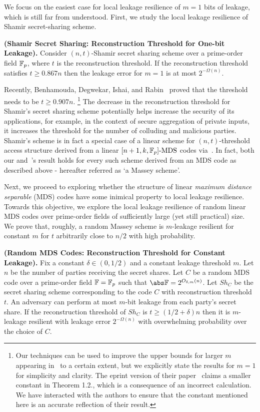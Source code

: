 We focus on the easiest case for local leakage resilience of $m=1$ bits of leakage, which is still far from understood. First, we study the local leakage resilience of Shamir secret-sharing scheme.


\begin{theorem}
\textbf{(Shamir Secret Sharing: Reconstruction Threshold for One-bit Leakage).} Consider $(n,t)$-Shamir secret sharing scheme over a prime-order field ${\mathbb F}_p$, where $t$ is the
reconstruction threshold. 
If the reconstruction threshold satisfies $t\geq 0.867n$ then the leakage error for $m=1$ is at most $2^{-\Omega(n)}$. 
\end{theorem}

Recently, Benhamouda, Degwekar, Ishai, and Rabin~\cite{C:BDIR18} proved that the threshold needs to be $t\geq 0.907n$.
\footnote{Our techniques can be used to improve the upper bounds for larger $m$ appearing in~\cite{C:BDIR18} to a certain extent, but we explicitly state the results for $m=1$ for simplicity and clarity.
  The eprint version of their paper~\cite{EPRINT:BDIR19} claims a smaller constant in Theorem 1.2., which is a consequence of an incorrect calculation.
  We have interacted with the authors to ensure that the constant mentioned here is an accurate reflection of their result. 
}
The decrease in the reconstruction threshold for Shamir's secret sharing scheme potentially helps increase the security of its applications, for example, in the context of secure aggregation of private inputs, it increases the threshold for the number of colluding and malicious parties. 
Shamir's scheme is in fact a special case of a linear scheme for $(n,t)$-threshold access structure
derived from a linear $[n+1,k,\mathbb{F}_p]\text{-MDS}$ codes via~\cite{Mas95}. 
In fact, both our and~\cite{C:BDIR18}'s result holds for every such scheme derived from an MDS code as described above - hereafter referred as `a Massey scheme'.

Next, we proceed to exploring whether the structure of linear {\em maximum distance separable} (MDS) codes have some inimical property to local leakage resilience. 
Towards this objective, we explore the local leakage resilience of random linear MDS codes over prime-order fields of sufficiently large (yet still practical) size. We prove that, roughly, a random Massey scheme is $m$-leakage resilient for constant $m$ for $t$ arbitrarily close to $n/2$ with high probability.


\begin{theorem}
\textbf{(Random MDS Codes: Reconstruction Threshold for Constant Leakage).}
Fix a constant $\delta\in(0,1/2)$ and a constant leakage threshold $m$. 
Let $n$ be the number of parties receiving the secret shares. 
Let $C$ be a random MDS code over a prime-order field ${\mathbb F}={\mathbb F}_p$ such that $\abs\bbF = 2^{O_{\delta,m}(n)}$. 
Let $Sh_C$ be the secret sharing scheme corresponding to the code $C$ with reconstruction threshold $t$.  
An adversary can perform at most $m$-bit leakage from each party's secret share. 
If the reconstruction threshold of $Sh_C$ is $t\geq (1/2 +\delta)n$ then it is $m$-leakage
resilient with leakage error $2^{-\Omega(n)}$ with overwhelming probability over the choice of $C$. 
\end{theorem}

